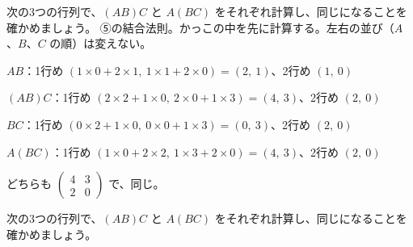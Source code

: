\begin{reidai}
次の3つの行列で、$(AB)C$ と $A(BC)$ をそれぞれ計算し、同じになることを確かめましょう。
\kangaekata ⑤の結合法則。かっこの中を先に計算する。左右の並び（$A$、$B$、$C$ の順）は変えない。\par
\shiki\kviids{}\zw{} $AB$：1行め $(1\times0+2\times1,\ 1\times1+2\times0)=(2,\ 1)$、2行め $(1,\ 0)$\par
\kviidb $(AB)C$：1行め $(2\times2+1\times0,\ 2\times0+1\times3)=(4,\ 3)$、2行め $(2,\ 0)$\par
\kviida $BC$：1行め $(0\times2+1\times0,\ 0\times0+1\times3)=(0,\ 3)$、2行め $(2,\ 0)$\par
\kviidb $A(BC)$：1行め $(1\times0+2\times2,\ 1\times3+2\times0)=(4,\ 3)$、2行め $(2,\ 0)$\par
\kotae\kviids{}\zw{} どちらも $\begin{pmatrix}4&3\\2&0\end{pmatrix}$ で、同じ。
\end{reidai}

\begin{jibun}
次の3つの行列で、$(AB)C$ と $A(BC)$ をそれぞれ計算し、同じになることを確かめましょう。
\end{jibun}

